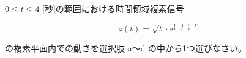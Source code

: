 $0 \leq t \leq 4$ [秒]の範囲における時間領域複素信号 

\[
z(t) = \sqrt{t} \cdot \textrm{e}^{\{ -j \cdot \frac{\pi}{4} \cdot t \}}
\]

\medskip
\noindent の複素平面内での動きを選択肢 a〜d の中から1つ選びなさい。
